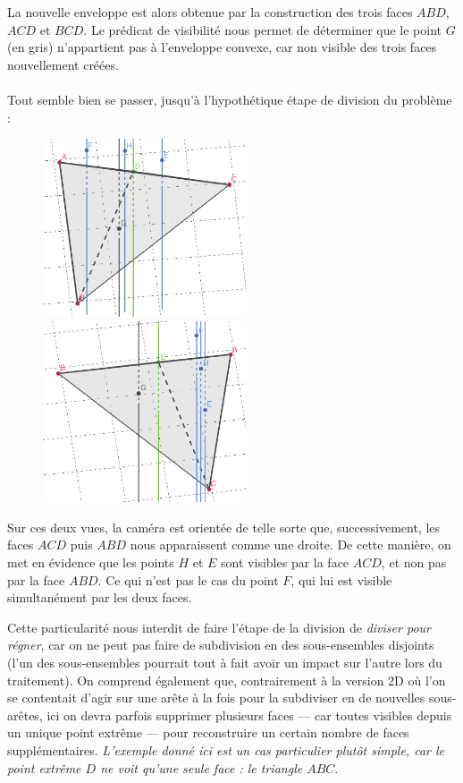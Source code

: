 \documentclass[]{article}
\begin{document}
La nouvelle enveloppe est alors obtenue par la construction des trois faces $ABD$, $ACD$ et $BCD$. Le prédicat de visibilité nous permet de déterminer que le point $G$ (en gris) n'appartient pas à l'enveloppe convexe, car non visible des trois faces nouvellement créées.

\paragraph{}
Tout semble bien se passer, jusqu'à l'hypothétique étape de division du problème :

\begin{figure}[H]
	\begin{center}
		\includegraphics[width=6cm]{qh3d/geogebra-export6.png}
		\includegraphics[width=6cm]{qh3d/geogebra-export7.png}
	\end{center}
\end{figure}

Sur ces deux vues, la caméra est orientée de telle sorte que, successivement, les faces $ACD$ puis $ABD$ nous apparaissent comme une droite. De cette manière, on met en évidence que les points $H$ et $E$ sont visibles par la face $ACD$, et non pas par la face $ABD$. Ce qui n'est pas le cas du point $F$, qui lui est visible simultanément par les deux faces.

Cette particularité nous interdit de faire l'étape de la division de \emph{diviser pour régner}, car on ne peut pas faire de subdivision en des sous-ensembles disjoints (l'un des sous-ensembles pourrait tout à fait avoir un impact sur l'autre lors du traitement). On comprend également que, contrairement à la version 2D où l'on se contentait d'agir sur une arête à la fois pour la subdiviser en de nouvelles sous-arêtes, ici on devra parfois supprimer plusieurs faces — car toutes visibles depuis un unique point extrême — pour reconstruire un certain nombre de faces supplémentaires. \emph{L'exemple donné ici est un cas particulier plutôt simple, car le point extrême $D$ ne voit qu'une seule face : le triangle $ABC$}.
\end{document}
